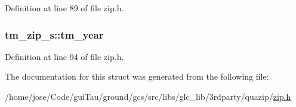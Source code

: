 Definition at line 89 of file zip.\-h.

\hypertarget{structtm__zip__s_ad58d60c6a536a0861dec11c6ef270753}{
\subsubsection[{tm\-\_\-year}]{ tm\-\_\-zip\-\_\-s\-::tm\-\_\-year}}\label{structtm__zip__s_ad58d60c6a536a0861dec11c6ef270753}


Definition at line 94 of file zip.\-h.



The documentation for this struct was generated from the following file\-:\begin{DoxyCompactItemize}
\item 
/home/jose/\-Code/gui\-Tau/ground/gcs/src/libs/glc\-\_\-lib/3rdparty/quazip/\hyperlink{zip_8h}{zip.\-h}\end{DoxyCompactItemize}
